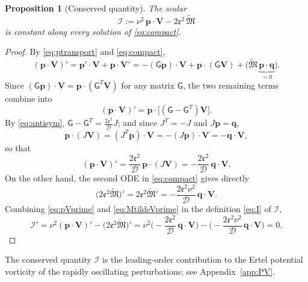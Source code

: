 \documentclass[reqno]{amsart}
\newcommand{\Msf}{\mathsf{G}}
\newcommand{\B}{{\mathfrak{M}}}
\newcommand{\D}{\mathcal{D}}
\newcommand{\ee}{\mathfrak{e}}
\newtheorem{proposition}[theorem]{Proposition}
\begin{document}
\begin{proposition}[Conserved quantity]\label{prop:PV}
The scalar
\begin{equation}\label{eq:I}
\mathcal I:=\nu^2\,\mathbf p\cdot\mathbf V-2\ee^2\,\widetilde{\B}
\end{equation}
is constant along every solution of \eqref{eq:compact}.
\end{proposition}
\begin{proof}
By \eqref{eq:ptransport} and \eqref{eq:compact},
\[
(\mathbf p\cdot\mathbf V)'=\mathbf p'\cdot\mathbf V+\mathbf p\cdot\mathbf V'
=-(\Msf\mathbf p)\cdot\mathbf V+\mathbf p\cdot(\Msf\mathbf V)+\Big(\widetilde{\B}\,\underbrace{\mathbf p\cdot\mathbf q}_{=0}\Big).
\]
Since $(\Msf\mathbf p)\cdot\mathbf V=\mathbf p\cdot(\Msf^T\mathbf V)$ for any matrix $\Msf$, the two remaining terms combine into
\[
(\mathbf p\cdot\mathbf V)'=\mathbf p\cdot\big[(\Msf-\Msf^T)\mathbf V\big].
\]
By \eqref{eq:antisym}, $\Msf-\Msf^T=\frac{2\ee^2}{\D}J$; and since $J^T=-J$ and $J\mathbf p=\mathbf q$,
\[
\mathbf p\cdot(J\mathbf V)=(J^T\mathbf p)\cdot\mathbf V=-(J\mathbf p)\cdot\mathbf V=-\mathbf q\cdot\mathbf V,
\]
so that
\begin{equation}\label{eq:pVprime}
(\mathbf p\cdot\mathbf V)'=\frac{2\ee^2}{\D}\,\mathbf p\cdot(J\mathbf V)=-\frac{2\ee^2}{\D}\,\mathbf q\cdot\mathbf V.
\end{equation}
On the other hand, the second ODE in \eqref{eq:compact} gives directly
\begin{equation}\label{eq:MtildeVprime}
\big(2\ee^2\widetilde{\B}\big)'=2\ee^2\widetilde{\B}'=-\frac{2\ee^2\nu^2}{\D}\,\mathbf q\cdot\mathbf V.
\end{equation}
Combining \eqref{eq:pVprime} and \eqref{eq:MtildeVprime} in the definition \eqref{eq:I} of $\mathcal I$,
\[
\mathcal I'=\nu^2(\mathbf p\cdot\mathbf V)'-\big(2\ee^2\widetilde{\B}\big)'
=\nu^2\Big(-\frac{2\ee^2}{\D}\,\mathbf q\cdot\mathbf V\Big)-\Big(-\frac{2\ee^2\nu^2}{\D}\,\mathbf q\cdot\mathbf V\Big)=0. 
\]
\end{proof}
\noindent
The conserved quantity $\mathcal I$ is the leading-order contribution to the Ertel potential vorticity of the rapidly oscillating perturbations; see Appendix~\ref{app:PV}.
\end{document}
